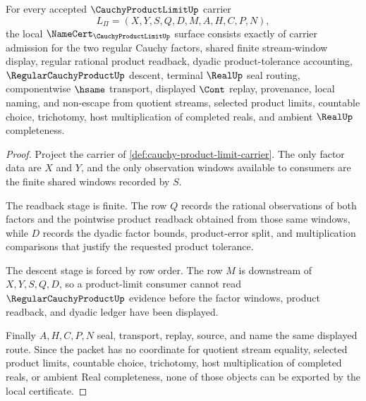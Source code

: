 \begin{theorem}
\label{thm:cauchy-product-limit-namecert-obligations}
For every accepted $\CauchyProductLimitUp$ carrier
$$
L_{\Pi}=(X,Y,S,Q,D,M,A,H,C,P,N),
$$
the local $\NameCert_{\CauchyProductLimitUp}$ surface consists exactly of carrier admission for the two regular Cauchy factors, shared finite stream-window display, regular rational product readback, dyadic product-tolerance accounting, $\RegularCauchyProductUp$ descent, terminal $\RealUp$ seal routing, componentwise $\hsame$ transport, displayed $\Cont$ replay, provenance, local naming, and non-escape from quotient streams, selected product limits, countable choice, trichotomy, host multiplication of completed reals, and ambient $\RealUp$ completeness.
\end{theorem}
\begin{proof}
Project the carrier of \autoref{def:cauchy-product-limit-carrier}. The only factor data are $X$ and $Y$, and the only observation windows available to consumers are the finite shared windows recorded by $S$.

The readback stage is finite. The row $Q$ records the rational observations of both factors and the pointwise product readback obtained from those same windows, while $D$ records the dyadic factor bounds, product-error split, and multiplication comparisons that justify the requested product tolerance.

The descent stage is forced by row order. The row $M$ is downstream of $X,Y,S,Q,D$, so a product-limit consumer cannot read $\RegularCauchyProductUp$ evidence before the factor windows, product readback, and dyadic ledger have been displayed.

Finally $A,H,C,P,N$ seal, transport, replay, source, and name the same displayed route. Since the packet has no coordinate for quotient stream equality, selected product limits, countable choice, trichotomy, host multiplication of completed reals, or ambient Real completeness, none of those objects can be exported by the local certificate.
\end{proof}

